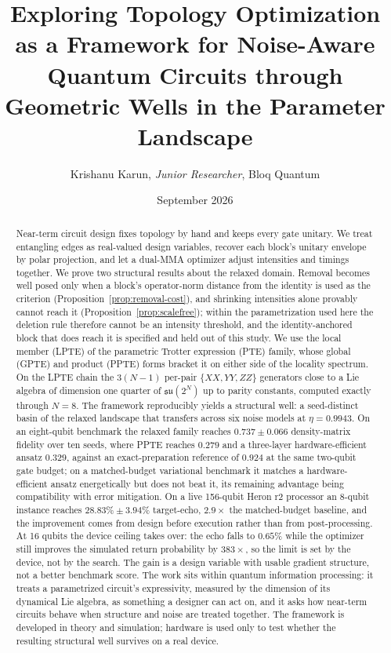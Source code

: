 \documentclass[twocolumn,aps,prl,superscriptaddress,showkeys]{revtex4-2}
\theoremstyle{plain}
\theoremstyle{definition}
\begin{document}
\title{Exploring Topology Optimization as a Framework for Noise-Aware Quantum Circuits through Geometric Wells in the Parameter Landscape}

\author{Krishanu Karun, \textit{Junior Researcher}, Bloq Quantum}
\date{September 2026}

\begin{abstract}
Near-term circuit design fixes topology by hand and keeps every gate unitary. We treat entangling edges as real-valued design variables, recover each block's unitary envelope by polar projection, and let a dual-MMA optimizer adjust intensities and timings together. We prove two structural results about the relaxed domain. Removal becomes well posed only when a block's operator-norm distance from the identity is used as the criterion (Proposition~\ref{prop:removal-cost}), and shrinking intensities alone provably cannot reach it (Proposition~\ref{prop:scalefree}); within the parametrization used here the deletion rule therefore cannot be an intensity threshold, and the identity-anchored block that does reach it is specified and held out of this study. We use the local member (LPTE) of the parametric Trotter expression (PTE) family, whose global (GPTE) and product (PPTE) forms bracket it on either side of the locality spectrum. On the LPTE chain the $3(N-1)$ per-pair $\{XX,YY,ZZ\}$ generators close to a Lie algebra of dimension one quarter of $\mathfrak{su}(2^N)$ up to parity constants, computed exactly through $N{=}8$. The framework reproducibly yields a structural well: a seed-distinct basin of the relaxed landscape that transfers across six noise models at $\eta=0.9943$. On an eight-qubit benchmark the relaxed family reaches $0.737\pm0.066$ density-matrix fidelity over ten seeds, where PPTE reaches $0.279$ and a three-layer hardware-efficient ansatz $0.329$, against an exact-preparation reference of $0.924$ at the same two-qubit gate budget; on a matched-budget variational benchmark it matches a hardware-efficient ansatz energetically but does not beat it, its remaining advantage being compatibility with error mitigation. On a live 156-qubit Heron r2 processor an 8-qubit instance reaches $28.83\%\pm3.94\%$ target-echo, $2.9\times$ the matched-budget baseline, and the improvement comes from design before execution rather than from post-processing. At 16 qubits the device ceiling takes over: the echo falls to $0.65\%$ while the optimizer still improves the simulated return probability by $383\times$, so the limit is set by the device, not by the search. The gain is a design variable with usable gradient structure, not a better benchmark score. The work sits within quantum information processing: it treats a parametrized circuit's expressivity, measured by the dimension of its dynamical Lie algebra, as something a designer can act on, and it asks how near-term circuits behave when structure and noise are treated together. The framework is developed in theory and simulation; hardware is used only to test whether the resulting structural well survives on a real device.
\end{abstract}
\end{document}
